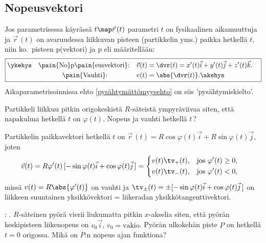 \subsection*{Nopeusvektori}

Jos parametrisessa käyrässä $t \map \vec r\,(t)$ parametri $t$ on fysikaalinen aikamuuttuja ja 
$\vec r\,(t)$ on avaruudessa liikkuvan pisteen (partikkelin yms.) paikka hetkellä $t$, niin
ko.\ pisteen p(vektori) ja p eli  
määritellään:
\[ \boxed{\begin{aligned} 
  \ykehys\quad \text{\pain{No}p\pain{eusvektori}:} \quad   
           &\vec v(t) = \dvr(t) = x'(t)\vec i + y'(t)\vec j + z'(t)\vec k. \quad \\
  \text{\pain{Vauhti}:} \quad\quad\quad\quad\ 
           &v(t) = \abs{\dvr(t)}. \akehys
          \end{aligned} } \]
Aikaparametrisoinnissa ehto \eqref{pysähtymättömyysehto} on siis 'pysähtymiskielto'.
\begin{Exa} \label{ympyräliike} Partikkeli liikkuu pitkin origokeskistä $R$-säteistä 
ympyräviivaa siten, että napakulma hetkellä $t$ on $\varphi(t)$. Nopeus ja vauhti hetkellä 
$t$\,? 
\end{Exa}
\ratk Partikkelin paikkavektori hetkellä $t$ on 
$\vec r\,(t) = R\cos\varphi(t)\vec i + R\sin\varphi(t)\vec j$, joten
\[ 
\vec v(t) = R\varphi'(t)\,[-\sin\varphi(t)\vec i + \cos\varphi(t)\vec j\,] 
          = \begin{cases} \begin{aligned} 
            v(t)\tv_+(t), \quad &\text{jos}\ \varphi'(t) \ge 0, \\
            v(t)\tv_-(t), \quad &\text{jos}\ \varphi'(t) < 0,
            \end{aligned} \end{cases} 
\]
missä $v(t) = R\abs{\varphi'(t)}$ on vauhti ja 
$\tv_\pm(t) = \pm[-\sin\varphi(t)\vec i + \cos\varphi(t)\vec j\,]$ on liikkeen suuntainen
yksikkövektori = liikeradan yksikkötangenttivektori. \loppu
\begin{Exa}: .  
$R$-säteinen pyörä vierii liukumatta pitkin $x$-akselia siten, että pyörän keskipisteen
liikenopeus on $v_0\vec i$, $v_0=\text{vakio}$. Pyörän ulkokehän piste $P$ on hetkellä $t=0$
origossa. Mikä on $P$:n nopeus ajan funktiona?
\end{Exa}
\ratk 
